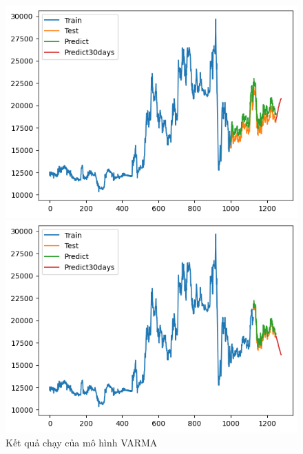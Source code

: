 \begin{figure}[H]
\begin{minipage}{0.15\textwidth}
    \includegraphics[width=1\textwidth]{resources/chapter-5/result/EIB_ RNN_8-2.png}
    \end{minipage}
    \hfill
        \begin{minipage}{0.15\textwidth}
    \centering
    \includegraphics[width=1\textwidth]{resources/chapter-5/result/EIB_ RNN_9-1.png}
    \end{minipage}
    \hfill
    
    \caption{Kết quả chạy của mô hình VARMA}
    \label{fig:RNN}
\end{figure}


